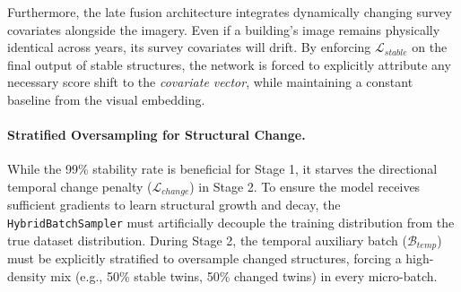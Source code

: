 \documentclass[12pt]{article}
\begin{document}
Furthermore, the late fusion architecture integrates dynamically changing survey covariates alongside the imagery. Even if a building's image remains physically identical across years, its survey covariates will drift. By enforcing $\mathcal{L}_{stable}$ on the final output of stable structures, the network is forced to explicitly attribute any necessary score shift to the \textit{covariate vector}, while maintaining a constant baseline from the visual embedding.

\paragraph{Stratified Oversampling for Structural Change.}
While the 99\% stability rate is beneficial for Stage 1, it starves the directional temporal change penalty ($\mathcal{L}_{change}$) in Stage 2. To ensure the model receives sufficient gradients to learn structural growth and decay, the \texttt{HybridBatchSampler} must artificially decouple the training distribution from the true dataset distribution. During Stage 2, the temporal auxiliary batch ($\mathcal{B}_{temp}$) must be explicitly stratified to oversample changed structures, forcing a high-density mix (e.g., 50\% stable twins, 50\% changed twins) in every micro-batch.
\end{document}
